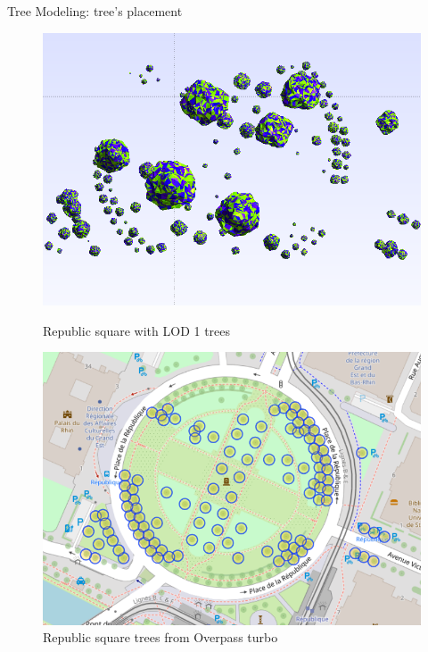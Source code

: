 \documentclass[10pt]{beamer}
\begin{document}
\begin{frame}{Tree Modeling: tree's placement}
  \begin{figure}[H]
	\centering
	\begin{minipage}{0.49\textwidth}
		\centering
		\includegraphics[width=1\textwidth]{images/republic-comparaison.png}
		\caption{Republic square with LOD 1 trees}
	\end{minipage}\hfill
	\begin{minipage}{0.49\textwidth}
		\centering
		\includegraphics[width=1\textwidth]{images/ovt-republic.png}
		\caption{Republic square trees from Overpass turbo\cite{overpass-turbo}}
	\end{minipage}
  \end{figure}
\end{frame}
\end{document}
